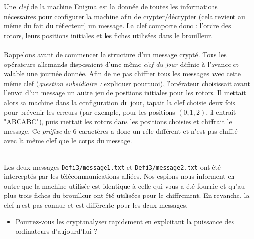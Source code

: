 \documentclass[11pt, a4paper]{article}
\begin{document}

\vspace{0.7cm}


\vspace{0.3cm}

\noindent Une \emph{clef} de la machine Enigma
est la donnée de toutes les informations nécessaires pour configurer la
machine afin de crypter/décrypter (cela revient au
même du fait du réflecteur) un message. La clef comporte donc :
l'ordre des rotors, leurs positions initiales et les fiches utilisées
dans le brouilleur.\\\\
Rappelons avant de commencer la structure d'un message
crypté. Tous les opérateurs allemands disposaient d'une même \emph{clef du jour} définie à l'avance et valable une journée donnée. Afin de ne pas
chiffrer tous les messages avec cette même clef (\emph{question
  subsidiaire :} expliquer pourquoi), l'opérateur choisissait avant
l'envoi d'un message un autre jeu de positions initiales pour les
rotors. Il mettait alors sa machine dans la configuration du jour,
tapait la clef choisie deux fois pour prévenir les erreurs (par
exemple, pour les positions $(0,1,2)$, il entrait "ABCABC"), puis
mettait les rotors dans les positions choisies et chiffrait le
message. Ce \emph{préfixe} de 6 caractères a donc un rôle différent et n'est pas chiffré avec la même clef que le corps du message.%

\\
Les deux messages \texttt{Defi3/message1.txt} et \texttt{Defi3/message2.txt} ont été interceptés par les télécommunications alliées. Nos espions nous informent en outre que la machine utilisée est identique à celle qui vous a été fournie et qu'au plus trois fiches du brouilleur ont été utilisées pour le chiffrement. En revanche, la clef n'est pas connue et est différente pour les deux messages. 
\begin{itemize}
\item[\polygona] Pourrez-vous les cryptanalyser rapidement en exploitant la puissance des ordinateurs d'aujourd'hui ?
\end{itemize}
\end{document}
